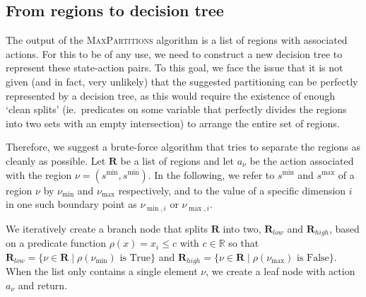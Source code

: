 
\subsection{From regions to decision tree}%
\label{sub:regionsToDT}

The output of the \textsc{MaxPartitions} algorithm is a list of regions with
associated actions. For this to be of any use, we need to construct a new
decision tree to represent these state-action pairs. To this goal, we face the
issue that it is not given (and in fact, very unlikely) that the suggested
partitioning can be perfectly represented by a decision tree, as this would
require the existence of enough `clean splits' (ie.\ predicates on some variable
that perfectly divides the regions into two sets with an empty intersection) to
arrange the entire set of regions.

Therefore, we suggest a brute-force algorithm that tries to separate the regions
as cleanly as possible. Let $\mathbf{R}$ be a list of regions and let $a_{\nu}$
be the action associated with the region $\nu = (s^{\min}, s^{\min})$. In the
following, we refer to $s^{\min}$ and $s^{\max}$ of a region $\nu$ by
$\nu_{\min}$ and $\nu_{\max}$ respectively, and to the value of a specific
dimension $i$ in one such boundary point as $\nu_{\min, i}$ or $\nu_{\max,i}$.

We iteratively create a branch node that splits $\mathbf{R}$ into two,
$\mathbf{R}_{low}$ and $\mathbf{R}_{high}$, based on a predicate function
$\rho(x) = x_i \le c$ with $c \in \mathbb{R}$ so that $\mathbf{R}_{low} = \{ \nu
\in \mathbf{R} \mid \rho(\nu_{\min}) \text{~is True} \}$ and $\mathbf{R}_{high}
= \{ \nu \in \mathbf{R} \mid \rho(\nu_{\max}) \text{~is False} \}$. When the
list only contains a single element $\nu$, we create a leaf node with action
$a_{\nu}$ and return.

